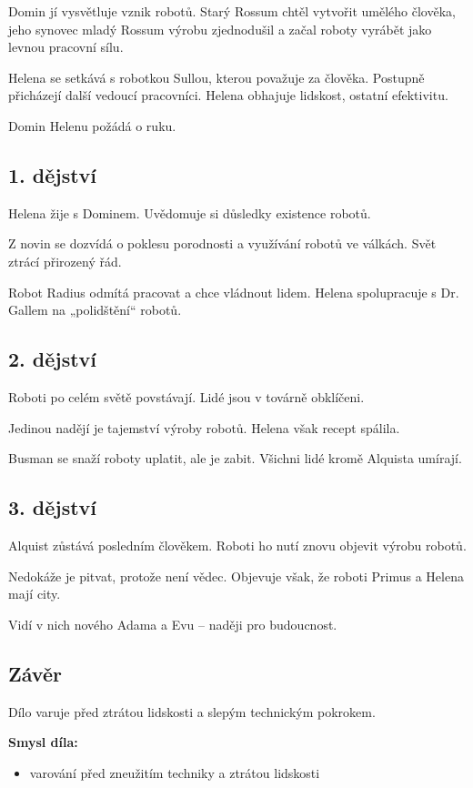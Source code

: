 \documentclass[12pt,a4paper]{article}
\begin{document}
\begin{tcolorbox}[breakable]
Domin jí vysvětluje vznik robotů. Starý Rossum chtěl vytvořit umělého člověka, jeho synovec mladý Rossum výrobu zjednodušil a začal roboty vyrábět jako levnou pracovní sílu.

Helena se setkává s robotkou Sullou, kterou považuje za člověka. Postupně přicházejí další vedoucí pracovníci. Helena obhajuje lidskost, ostatní efektivitu.

Domin Helenu požádá o ruku.

\subsection*{1. dějství}
Helena žije s Dominem. Uvědomuje si důsledky existence robotů.

Z novin se dozvídá o poklesu porodnosti a využívání robotů ve válkách. Svět ztrácí přirozený řád.

Robot Radius odmítá pracovat a chce vládnout lidem. Helena spolupracuje s Dr. Gallem na „polidštění“ robotů.

\subsection*{2. dějství}
Roboti po celém světě povstávají. Lidé jsou v továrně obklíčeni.

Jedinou nadějí je tajemství výroby robotů. Helena však recept spálila.

Busman se snaží roboty uplatit, ale je zabit. Všichni lidé kromě Alquista umírají.

\subsection*{3. dějství}
Alquist zůstává posledním člověkem. Roboti ho nutí znovu objevit výrobu robotů.

Nedokáže je pitvat, protože není vědec. Objevuje však, že roboti Primus a Helena mají city.

Vidí v nich nového Adama a Evu – naději pro budoucnost.

\subsection*{Závěr}
Dílo varuje před ztrátou lidskosti a slepým technickým pokrokem.

\textbf{Smysl díla:}
\begin{itemize}
\item varování před zneužitím techniky a ztrátou lidskosti
\end{itemize}


\end{tcolorbox}
\end{document}

